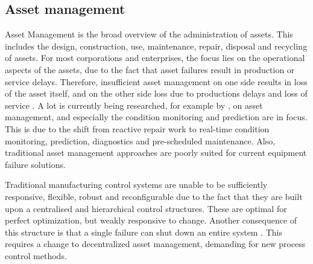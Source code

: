 	 


\subsection{Asset management}
	Asset Management is the broad overview of the administration of assets. This includes the design, construction, use, maintenance, repair, disposal and recycling of assets. For most corporations and enterprises, the focus lies on the operational aspects of the assets, due to the fact that asset failures result in production or service delays. Therefore, insufficient asset management on one side results in loss of the asset itself, and on the other side loss due to productions delays and loss of service \citep{trappey2013multi}.  A lot is currently being researched, for example by \citet{leitao2009agent}, on asset management, and especially the condition monitoring and prediction are in focus. This is due to the shift from reactive repair work to real-time condition monitoring, prediction, diagnostics and pre-scheduled maintenance. Also, traditional asset management approaches are poorly suited for current equipment failure solutions. %
	
	Traditional manufacturing control systems are unable to be sufficiently responsive, flexible, robust and reconfigurable due to the fact that they are built upon a centralised and hierarchical control structures. These are optimal for perfect optimization, but weakly responsive to change. Another consequence of this structure is that a single failure can shut down an entire system \citep{leitao2009agent}. This requires a change to decentralized asset management, demanding for new process control methods.
	
	
